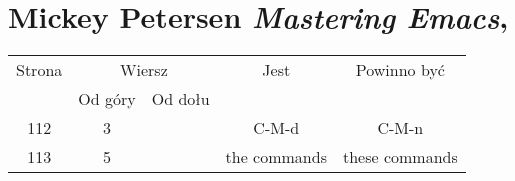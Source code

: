 \documentclass[a4paper,11pt]{article}
\numberwithin{equation}{section}
\begin{document}






\section{Mickey Petersen \textit{Mastering Emacs},
  \parencite{Petersen-Mastering-Emacs-Pub-2016}}

\label{sec:Petersen-Mastering-Emacs-Pub-2016}






\begin{center}

  \begin{tabular}{|c|c|c|c|c|}
    \hline
    Strona & \multicolumn{2}{c|}{Wiersz} & Jest
                              & Powinno być \\ \cline{2-3}
    & Od góry & Od dołu & & \\
    \hline
    112 & 3 & & C-M-d & C-M-n \\
    113 & 5 & & the commands & these commands \\
    \hline
  \end{tabular}

\end{center}

\VerSpaceTwo










\printbibliography





\end{document}
